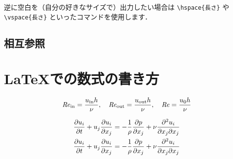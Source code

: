 逆に空白を（自分の好きなサイズで）出力したい場合は \verb|\hspace{長さ}| や \verb|\vspace{長さ}| といったコマンドを使用します．

\subsection{相互参照}
\label{ssec:ref}


\section{\LaTeX での数式の書き方}
\label{sec:formula_in_LaTeX}


\begin{equation}
    \mathit{Re}_{\mathrm{in}} = \frac{u_{\mathrm{in}} h}{\nu}, \quad \mathit{Re}_{\mathrm{out}} = \frac{u_{\mathrm{out}} h}{\nu}, \quad \mathit{Re} = \frac{u_0 h}{\nu}
\end{equation}

\begin{align}
    \frac{\partial u_i}{\partial t} + u_j\frac{\partial u_i}{\partial x_j} &= - \frac{1}{\rho}\frac{\partial p}{\partial x_j} + \nu\frac{\partial^2 u_i}{\partial x_j \partial x_j} \\
    \pdv{u_i}{t} + u_j\pdv{u_i}{x_j} &= - \frac{1}{\rho}\pdv{p}{x_j} + \nu\pdv{u_i}{x_j}{x_j}
\end{align}



